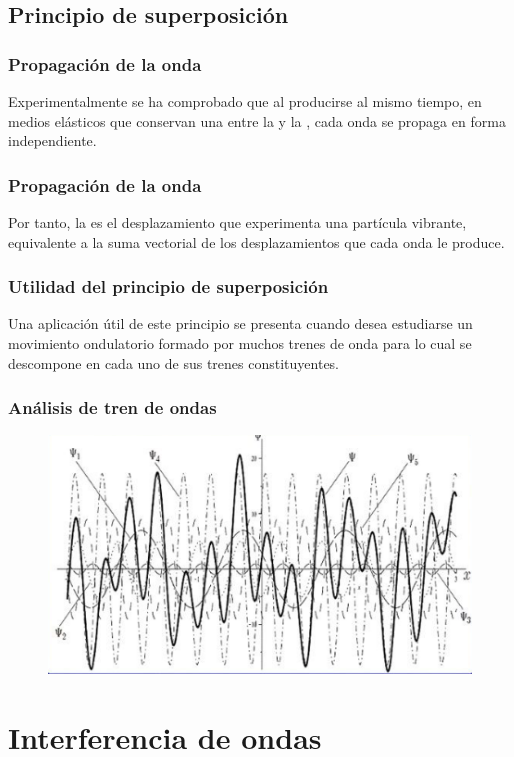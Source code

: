 \documentclass[14pt]{beamer}
\begin{document}
\subsection{Principio de superposición}

\begin{frame}
\frametitle{Propagación de la onda}
Experimentalmente se ha comprobado que al producirse  al mismo tiempo, \pause en medios elásticos que conservan una  entre la  y la , cada onda se propaga en forma independiente.
\end{frame}
\begin{frame}
\frametitle{Propagación de la onda}
Por tanto, la  es el desplazamiento que experimenta una partícula vibrante, \pause equivalente a la suma vectorial de los desplazamientos que cada onda le produce.
\end{frame}
\begin{frame}
\frametitle{Utilidad del principio de superposición}
Una aplicación útil de este principio se presenta cuando desea estudiarse un movimiento ondulatorio formado por muchos trenes de onda para lo cual se descompone en cada uno de sus trenes constituyentes.
\end{frame}
\begin{frame}
\frametitle{Análisis de tren de ondas}
\begin{figure}
    \centering
    \includegraphics[scale=0.7]{Imagenes/Tren_Onda_02.png}
\end{figure}
\end{frame}


\section{Interferencia de ondas}
\end{document}
